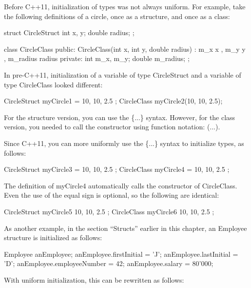 
Before C++11, initialization of types was not always uniform. For example, take the following definitions of a circle, once as a structure, and once as a class:

\begin{cpp}
struct CircleStruct
{
    int x, y;
    double radius;
};

class CircleClass
{
    public:
        CircleClass(int x, int y, double radius)
            : m_x { x }, m_y { y }, m_radius { radius } {}
    private:
        int m_x, m_y;
        double m_radius;
};
\end{cpp}

In pre-C++11, initialization of a variable of type CircleStruct and a variable of type CircleClass looked different:

\begin{cpp}
CircleStruct myCircle1 = { 10, 10, 2.5 };
CircleClass myCircle2(10, 10, 2.5);
\end{cpp}

For the structure version, you can use the \{...\} syntax. However, for the class version, you needed to call the constructor using function notation: (...).

Since C++11, you can more uniformly use the \{...\} syntax to initialize types, as follows:

\begin{cpp}
CircleStruct myCircle3 = { 10, 10, 2.5 };
CircleClass myCircle4 = { 10, 10, 2.5 };
\end{cpp}

The definition of myCircle4 automatically calls the constructor of CircleClass. Even the use of the equal sign is optional, so the following are identical:

\begin{cpp}
CircleStruct myCircle5 { 10, 10, 2.5 };
CircleClass myCircle6 { 10, 10, 2.5 };
\end{cpp}

As another example, in the section “Structs” earlier in this chapter, an Employee structure is initialized as follows:

\begin{cpp}
Employee anEmployee;
anEmployee.firstInitial = 'J';
anEmployee.lastInitial = 'D';
anEmployee.employeeNumber = 42;
anEmployee.salary = 80'000;
\end{cpp}

With uniform initialization, this can be rewritten as follows:

